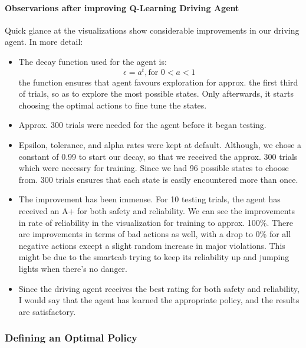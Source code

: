 \documentclass[11pt]{article}
\providecommand{\tightlist}{%
      \setlength{\itemsep}{0pt}\setlength{\parskip}{0pt}}
\begin{document}
    \hypertarget{observarions-after-improving-q-learning-driving-agent}{%
\paragraph{Observarions after improving Q-Learning Driving
Agent}\label{observarions-after-improving-q-learning-driving-agent}}

Quick glance at the visualizations show considerable improvements in our
driving agent. In more detail:

\begin{itemize}
\tightlist
\item
  The decay function used for the agent is:
  \[ \epsilon = a^t, \textrm{for } 0 < a < 1 \ \] the function ensures
  that agent favours exploration for approx. the first third of trials,
  so as to explore the most possible states. Only afterwards, it starts
  choosing the optimal actions to fine tune the states.
\item
  Approx. 300 trials were needed for the agent before it began testing.
\item
  Epsilon, tolerance, and alpha rates were kept at default. Although, we
  chose a constant of 0.99 to start our decay, so that we received the
  approx. 300 trials which were necessry for training. Since we had 96
  possible states to choose from. 300 trials ensures that each state is
  easily encountered more than once.
\item
  The improvement has been immense. For 10 testing trials, the agent has
  received an A+ for both safety and reliability. We can see the
  improvements in rate of reliability in the visualization for training
  to approx. 100\%. There are improvements in terms of bad actions as
  well, with a drop to 0\% for all negative actions except a slight
  random increase in major violations. This might be due to the smartcab
  trying to keep its reliability up and jumping lights when there's no
  danger.
\item
  Since the driving agent receives the best rating for both safety and
  reliability, I would say that the agent has learned the appropriate
  policy, and the results are satisfactory.
\end{itemize}

    \hypertarget{defining-an-optimal-policy}{%
\subsubsection{Defining an Optimal
Policy}\label{defining-an-optimal-policy}}
\end{document}
